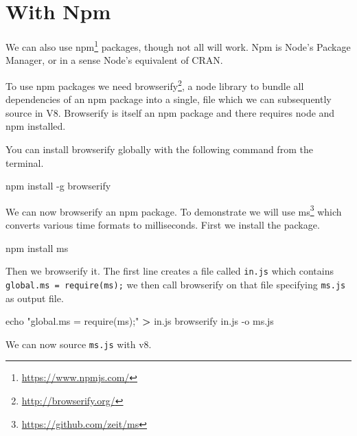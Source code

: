 \documentclass[
]{krantz}
\makeatletter
\newenvironment{Shaded}{\begin{snugshade}}{\end{snugshade}}
\newcommand{\BuiltInTok}[1]{#1}
\newcommand{\ExtensionTok}[1]{#1}
\newcommand{\KeywordTok}[1]{\textcolor[rgb]{0.27,0.27,0.27}{\textbf{#1}}}
\newcommand{\NormalTok}[1]{#1}
\newcommand{\OperatorTok}[1]{\textcolor[rgb]{0.43,0.43,0.43}{\textbf{#1}}}
\newcommand{\StringTok}[1]{\textcolor[rgb]{0.5,0.5,0.5}{#1}}
\renewcommand{\href}[2]{#2\footnote{\url{#1}}}
\newenvironment{kframe}{%
\medskip{}
\setlength{\fboxsep}{.8em}
 \def\at@end@of@kframe{}%
 \ifinner\ifhmode%
  \def\at@end@of@kframe{\end{minipage}}%
  \begin{minipage}{\columnwidth}%
 \fi\fi%
 \def\FrameCommand##1{\hskip\@totalleftmargin \hskip-\fboxsep
 \colorbox{shadecolor}{##1}\hskip-\fboxsep
     \hskip-\linewidth \hskip-\@totalleftmargin \hskip\columnwidth}%
 \MakeFramed {\advance\hsize-\width
   \@totalleftmargin\z@ \linewidth\hsize
   \@setminipage}}%
 {\par\unskip\endMakeFramed%
 \at@end@of@kframe}
\renewenvironment{Shaded}{\begin{kframe}}{\end{kframe}}
\makeatother
\begin{document}
\hypertarget{with-npm}{%
\section*{With Npm}\label{with-npm}}


We can also use \href{https://www.npmjs.com/}{npm} packages, though not all will work. Npm is Node's Package Manager, or in a sense Node's equivalent of CRAN.

To use npm packages we need \href{http://browserify.org/}{browserify}, a node library to bundle all dependencies of an npm package into a single, file which we can subsequently source in V8. Browserify is itself an npm package and there requires node and npm installed.

You can install browserify globally with the following command from the terminal.

\begin{Shaded}
\begin{Highlighting}[]
\ExtensionTok{npm}\NormalTok{ install {-}g browserify}
\end{Highlighting}
\end{Shaded}

We can now browserify an npm package. To demonstrate we will use \href{https://github.com/zeit/ms}{ms} which converts various time formats to milliseconds. First we install the package.

\begin{Shaded}
\begin{Highlighting}[]
\ExtensionTok{npm}\NormalTok{ install ms}
\end{Highlighting}
\end{Shaded}

Then we browserify it. The first line creates a file called \texttt{in.js} which contains \texttt{global.ms\ =\ require(\textquotesingle{}ms\textquotesingle{});} we then call browserify on that file specifying \texttt{ms.js} as output file.

\begin{Shaded}
\begin{Highlighting}[]
\BuiltInTok{echo} \StringTok{"global.ms = require(\textquotesingle{}ms\textquotesingle{});"} \OperatorTok{>}\NormalTok{ in.js}
\ExtensionTok{browserify}\NormalTok{ in.js {-}o ms.js}
\end{Highlighting}
\end{Shaded}

We can now source \texttt{ms.js} with v8.

\begin{Shaded}
\end{Shaded}
\end{document}
